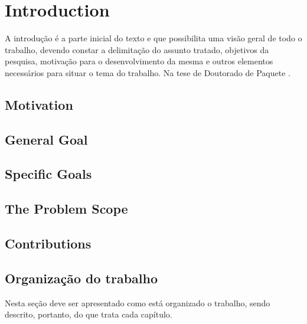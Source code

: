 \chapter{Introduction}

A introdução é a parte inicial do texto e que possibilita uma visão geral de todo o trabalho, devendo constar a delimitação do assunto tratado, objetivos da pesquisa, motivação para o desenvolvimento da mesma e outros elementos necessários para situar o tema do trabalho. Na tese de Doutorado de Paquete \cite{PaquetePhD}.

\section{Motivation}

\section{General Goal}

\section{Specific Goals}

\section{The Problem Scope}

\section{Contributions}

\section{Organização do trabalho}

Nesta seção deve ser apresentado como está organizado o trabalho, sendo descrito, portanto, do que trata cada capítulo.